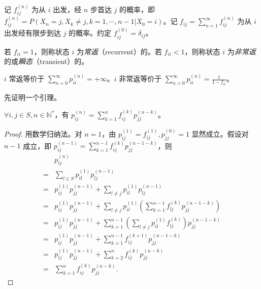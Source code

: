 \documentclass[../main.tex]{subfiles}
\begin{document}
\begin{definition}\label{def:7.3.3}
    记 $f_{ij}^{(n)}$ 为从 $i$ 出发，经 $n$ 步首达 $j$ 的概率，即 $f_{ij}^{(n)}=P(X_n=j,X_k\neq j,k=1,\cdots,n-1|X_0=i)$。记 $f_{ij}=\sum_{n=1}^\infty f_{ij}^{(n)}$ 为从 $i$ 出发经有限步到达 $j$ 的概率。约定 $f_{ij}^{(0)}=\delta_{ij}$。
\end{definition}

\begin{definition}\label{def:7.3.4}
    若 $f_{ii}=1$，则称状态 $i$ 为\emph{常返}（recurrent）的。若 $f_{ii}<1$，则称状态 $i$ 为\emph{非常返}的或\emph{瞬态}（transient）的。
\end{definition}

\begin{theorem}\label{thm:7.3.1}
    $i$ 常返等价于 $\sum_{n=0}^\infty p_{ii}^{(n)}=+\infty$。$i$ 非常返等价于 $\sum_{n=0}^\infty p_{ii}^{(n)}=\frac1{1-f_{ii}}$。
\end{theorem}

先证明一个引理。

\begin{lemma}
    $\forall i,j\in S,n\in\mathbb N^*$，有 $p_{ij}^{(n)}=\sum_{k=1}^nf_{ij}^{(k)}p_{jj}^{(n-k)}$。
\end{lemma}

\begin{proof}
    用数学归纳法。对 $n=1$，由 $p_{ij}^{(1)}=f_{ij}^{(1)},p_{jj}^{(0)}=1$ 显然成立。假设对 $n-1$ 成立，即 $p_{ij}^{(n-1)}=\sum_{k=1}^{n-1}f_{ij}^{(k)}p_{jj}^{(n-1-k)}$，则
    \begin{equation*}
        \begin{aligned}
              & p_{ij}^{(n)}                                                                                        \\
            = & \sum_{l\in S}p_{il}^{(1)}p_{lj}^{(n-1)}                                                             \\
            = & p_{ij}^{(1)}p_{jj}^{(n-1)}+\sum_{l\neq j}p_{il}^{(1)}p_{lj}^{(n-1)}                                 \\
            = & p_{ij}^{(1)}p_{jj}^{(n-1)}+\sum_{l\neq j}p_{il}^{(1)}(\sum_{k=1}^{n-1}f_{lj}^{(k)}p_{jj}^{(n-1-k)}) \\
            = & p_{ij}^{(1)}p_{jj}^{(n-1)}+\sum_{k=1}^{n-1}(\sum_{l\neq j}p_{il}^{(1)}f_{lj}^{(k)})p_{jj}^{(n-1-k)} \\
            = & p_{ij}^{(1)}p_{jj}^{(n-1)}+\sum_{k=1}^{n-1}f_{ij}^{(k+1)}p_{jj}^{(n-1-k)}                           \\
            = & p_{ij}^{(1)}p_{jj}^{(n-1)}+\sum_{k=2}^nf_{ij}^{(k)}p_{jj}^{(n-k)}                                   \\
            = & \sum_{k=1}^nf_{ij}^{(k)}p_{jj}^{(n-k)}.
        \end{aligned}
    \end{equation*}
\end{proof}
\end{document}
